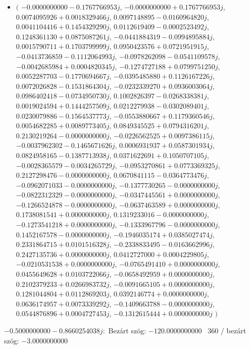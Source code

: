 \documentclass[14pt,a4paper]{article}
\begin{document}
\begin{itemize}
\item
$\big($
$-0.0000000000-0.1767766953j$, $-0.0000000000+0.1767766953j$, $0.0074095926+0.0018329466j$, $0.0097148895-0.0160964820j$, $0.0041104416+0.1454329290j$, $0.0112619409-0.0002523492j$, $0.1248361130+0.0875087261j$, $-0.0441884319-0.0994895884j$, $0.0015790711+0.1703799999j$, $0.0950423576+0.0721951915j$, $-0.0413736859-0.1112064993j$, $-0.0978262098-0.0541109578j$, $-0.0042685984+0.0004820345j$, $-0.1274727188+0.0799751250j$, $0.0052287703-0.1770694667j$, $-0.0395485880+0.1126167226j$, $0.0072026828-0.1531864304j$, $-0.0232339270+0.0936003064j$, $0.0986402418-0.0734950730j$, $0.1002826397-0.0268338381j$, $0.0019024594+0.1444257509j$, $0.0212279938-0.0302089401j$, $0.0230079886-0.1564537773j$, $-0.0553880667+0.1179360546j$, $0.0054682285+0.0089773405j$, $0.0849345525+0.0794316201j$, $0.2130219264-0.0000000000j$, $-0.0226562525+0.0097386115j$, $-0.0037962302-0.1465671626j$, $0.0006931937+0.0587301934j$, $0.0824958165-0.1387713938j$, $0.0371622691+0.1050707105j$, $-0.0028365579-0.0034265729j$, $-0.0953270861+0.0773369325j$, $0.2127298476-0.0000000000j$, $0.0670841115-0.0364773476j$, $-0.0962071033-0.0000000000j$, $-0.1377730265-0.0000000000j$, $-0.0822312329-0.0000000000j$, $-0.0347445561+0.0000000000j$, $-0.1266524878-0.0000000000j$, $-0.0637463589+0.0000000000j$, $0.1738081541+0.0000000000j$, $0.1319233016-0.0000000000j$, $-0.1273541218+0.0000000000j$, $-0.1333967796-0.0000000000j$, $0.1452167578-0.0000000000j$, $-0.1946035174+0.0385027474j$, $0.2331864715+0.0101516328j$, $-0.2338833495-0.0163662996j$, $0.2427135736+0.0000000000j$, $0.0412727000+0.0004229805j$, $-0.0210531538+0.0000000000j$, $-0.0765491410+0.0000000000j$, $0.0455649628+0.0103722066j$, $-0.0658492959+0.0000000000j$, $0.2102379233+0.0266983732j$, $-0.0091665105+0.0000000000j$, $0.1281044804+0.0112869203j$, $0.0392146774+0.0000000000j$, $0.0636174957+0.0073339292j$, $-0.1409663788-0.0000000000j$, $0.0544876896+0.0004727453j$, $-0.1312615444+0.0000000000j$
$\big)$
\end{itemize}
$-0.5000000000-0.8660254038j$:\
Bezárt szög: $-120.0000000000$ \
360 / bezárt szög: $-3.0000000000$\
\end{document}

